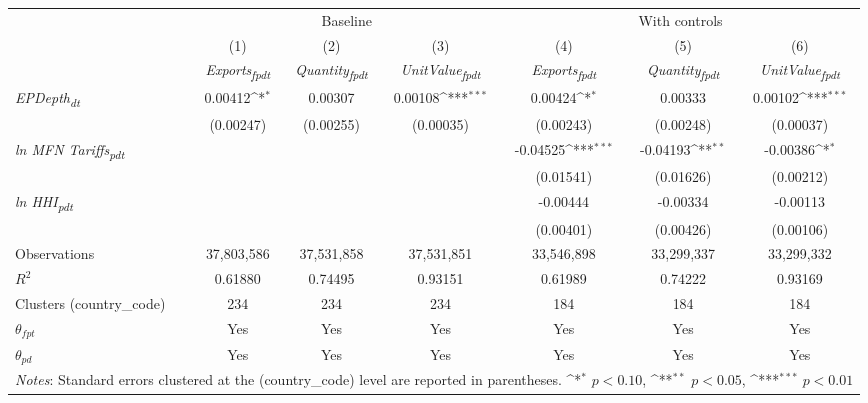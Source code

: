 {
\def\sym#1{\ifmmode^{#1}\else\(^{#1}\)\fi}
\begin{tabular}{l*{6}{c}}
\toprule
&\multicolumn{3}{c}{Baseline}&\multicolumn{3}{c}{With controls}\\\cmidrule(lr){2-4}\cmidrule(lr){5-7}
&(1)&(2)&(3)&(4)&(5)&(6)\\
&\textit{Exports\textsubscript{fpdt}}&\textit{Quantity\textsubscript{fpdt}}&\textit{UnitValue\textsubscript{fpdt}}&\textit{Exports\textsubscript{fpdt}}&\textit{Quantity\textsubscript{fpdt}}&\textit{UnitValue\textsubscript{fpdt}}\\
\midrule
\textit{EPDepth\textsubscript{dt}} & 0.00412\sym{*} & 0.00307 & 0.00108\sym{***} & 0.00424\sym{*} & 0.00333 & 0.00102\sym{***}\\
 & (0.00247) & (0.00255) & (0.00035) & (0.00243) & (0.00248) & (0.00037)\\
\addlinespace
\textit{ln MFN Tariffs\textsubscript{pdt}} &  &  &  & -0.04525\sym{***} & -0.04193\sym{**} & -0.00386\sym{*}\\
 &  &  &  & (0.01541) & (0.01626) & (0.00212)\\
\addlinespace
\textit{ln HHI\textsubscript{pdt}} &  &  &  & -0.00444 & -0.00334 & -0.00113\\
 &  &  &  & (0.00401) & (0.00426) & (0.00106)\\
\midrule
Observations & 37,803,586 & 37,531,858 & 37,531,851 & 33,546,898 & 33,299,337 & 33,299,332\\
$R^{2}$ & 0.61880 & 0.74495 & 0.93151 & 0.61989 & 0.74222 & 0.93169\\
Clusters (country_code) & 234 & 234 & 234 & 184 & 184 & 184\\
$\theta_{fpt}$ & Yes & Yes & Yes & Yes & Yes & Yes\\
$\theta_{pd}$ & Yes & Yes & Yes & Yes & Yes & Yes\\
\bottomrule
\multicolumn{7}{l}{\footnotesize \textit{Notes}: Standard errors clustered at the (country_code) level are reported in parentheses. \sym{*} \(p<0.10\), \sym{**} \(p<0.05\), \sym{***} \(p<0.01\)}\\
\end{tabular}
}
